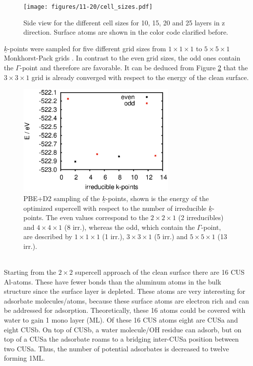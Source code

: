 \documentclass[11pt,DIV=13,BCOR=5mm,a4paper,headinclude]{scrbook}
\renewcommand{\vec}[1]{\underline{#1}}
\begin{document}
\begin{figure}[!h]
    \centering
    \texttt{[image: figures/11-20/cell\_sizes.pdf]}
             \caption{Side view for the different cell sizes for 10, 15, 20 and 25 layers in z direction.
Surface atoms are shown in the color code clarified before.}
            \label{abb:cell_sizes}
\end{figure}
$\vec{k}$-points were sampled for five different grid sizes from $1\times 1\times 1$ to $5\times 5\times 1$ Monkhorst-Pack grids \cite{monkhorst}.
In contrast to the even grid sizes, the odd ones contain the $\Gamma$-point and therefore are favorable.
It can be deduced from Figure \ref{abb:11-20-kpointsampling} that the $3\times 3\times 1$ grid is already converged with respect to the energy of the clean surface.
\begin{figure}[!h]
\centering
 \includegraphics[width=0.7\textwidth]{figures/11-20/irreducibles-E.eps}
   \caption{PBE+D2 sampling of the $\vec{k}$-points, shown is the energy of the optimized supercell with respect to the number of irreducible $\vec{k}$-points.
The even values correspond to the $2\times 2 \times 1$ (2 irreducibles) and $4\times 4\times 1$ (8 irr.), whereas the odd, which contain the $\Gamma$-point, are described by $1\times 1\times 1$ (1 irr.), $3\times 3\times 1$ (5 irr.) and $5\times 5\times 1$ (13 irr.).}
            \label{abb:11-20-kpointsampling}
\end{figure}
\\

Starting from the $2\times 2$ supercell approach of the clean surface there are 16 CUS Al-atoms.
These have fewer bonds than the aluminum atoms in the bulk structure since the surface layer is  depleted.
These atoms are very interesting for adsorbate molecules/atoms, because these surface atoms are electron rich and can be addressed for adsorption.
Theoretically, these 16 atoms could be covered with water to gain 1 mono layer (ML).
Of these 16 CUS atoms eight are CUSa and eight CUSb.
On top of CUSb, a water molecule/OH residue can adsorb, but on top of a CUSa the adsorbate roams to a bridging inter-CUSa position between two CUSa.
Thus, the number of potential adsorbates is decreased to twelve forming 1ML.
\end{document}
